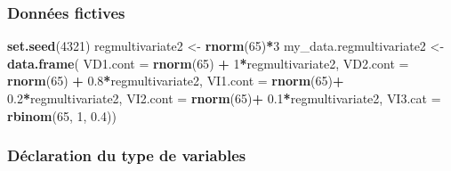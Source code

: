 \documentclass[
]{book}
\newenvironment{Shaded}{\begin{snugshade}}{\end{snugshade}}
\newcommand{\DataTypeTok}[1]{\textcolor[rgb]{0.13,0.29,0.53}{#1}}
\newcommand{\DecValTok}[1]{\textcolor[rgb]{0.00,0.00,0.81}{#1}}
\newcommand{\FloatTok}[1]{\textcolor[rgb]{0.00,0.00,0.81}{#1}}
\newcommand{\KeywordTok}[1]{\textcolor[rgb]{0.13,0.29,0.53}{\textbf{#1}}}
\newcommand{\NormalTok}[1]{#1}
\newcommand{\OperatorTok}[1]{\textcolor[rgb]{0.81,0.36,0.00}{\textbf{#1}}}
\newcommand{\StringTok}[1]{\textcolor[rgb]{0.31,0.60,0.02}{#1}}
\begin{document}
\hypertarget{donnuxe9es-fictives-23}{%
\subsubsection{Données fictives}\label{donnuxe9es-fictives-23}}

\begin{Shaded}
\begin{Highlighting}[]
\KeywordTok{set.seed}\NormalTok{(}\DecValTok{4321}\NormalTok{)}
\NormalTok{regmultivariate2 <-}\StringTok{ }\KeywordTok{rnorm}\NormalTok{(}\DecValTok{65}\NormalTok{)}\OperatorTok{*}\DecValTok{3}
\NormalTok{my_data.regmultivariate2 <-}\StringTok{ }\KeywordTok{data.frame}\NormalTok{(}
  \DataTypeTok{VD1.cont =} \KeywordTok{rnorm}\NormalTok{(}\DecValTok{65}\NormalTok{) }\OperatorTok{+}\StringTok{ }\DecValTok{1}\OperatorTok{*}\NormalTok{regmultivariate2,}
  \DataTypeTok{VD2.cont =} \KeywordTok{rnorm}\NormalTok{(}\DecValTok{65}\NormalTok{) }\OperatorTok{+}\StringTok{ }\FloatTok{0.8}\OperatorTok{*}\NormalTok{regmultivariate2,}
  \DataTypeTok{VI1.cont =} \KeywordTok{rnorm}\NormalTok{(}\DecValTok{65}\NormalTok{)}\OperatorTok{+}\StringTok{ }\FloatTok{0.2}\OperatorTok{*}\NormalTok{regmultivariate2,}
  \DataTypeTok{VI2.cont =} \KeywordTok{rnorm}\NormalTok{(}\DecValTok{65}\NormalTok{)}\OperatorTok{+}\StringTok{ }\FloatTok{0.1}\OperatorTok{*}\NormalTok{regmultivariate2,}
  \DataTypeTok{VI3.cat =} \KeywordTok{rbinom}\NormalTok{(}\DecValTok{65}\NormalTok{, }\DecValTok{1}\NormalTok{, }\FloatTok{0.4}\NormalTok{))}
\end{Highlighting}
\end{Shaded}

\hypertarget{duxe9claration-du-type-de-variables-22}{%
\subsubsection{Déclaration du type de variables}\label{duxe9claration-du-type-de-variables-22}}

\begin{Shaded}
\end{Shaded}
\end{document}
